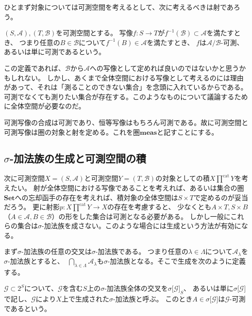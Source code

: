 \documentclass[../root.tex]{subfiles}
\begin{document}
ひとまず対象については可測空間を考えるとして、次に考えるべきは射であろう。

\begin{Def}{}{}
$ ( S, \mathscr{A} ), ( T, \mathscr{B} ) $を可測空間とする。
写像$ f\colon S\rightarrow T $が$ f^{-1}(\mathscr{B})\subset\mathscr{A} $を満たすとき、
つまり任意の$ B\in\mathscr{B} $について$ f^{-1}( B )\in\mathscr{A} $を満たすとき、
$ f $は$ \mathscr{A}/\mathscr{B} $-可測、あるいは単に可測であるという。
\end{Def}

この定義であれば、$ \mathscr{B} $から$ \mathscr{A} $への写像として定めれば良いのではないかと思うかもしれない。
しかし、あくまで全体空間における写像として考えるのには理由があって、それは「測ることのできない集合」を念頭に入れているからである。
可測でなくても測りたい集合が存在する。このようなものについて議論するために全体空間が必要なのだ。

可測写像の合成は可測であり、恒等写像はもちろん可測である。故に可測空間と可測写像は圏の対象と射を定める。これを圏$ \mathbf{meas} $と記すことにする。




\subsection{$ \sigma $-加法族の生成と可測空間の積}
次に可測空間$ X=( S, \mathscr{A} ) $と可測空間$ Y=( T, \mathscr{B} ) $の対象としての積$ X\prod^{\mathrm{cat}}Y $を考えたい。
射が全体空間における写像であることを考えれば、あるいは集合の圏$ \mathbf{Set} $への忘却函手の存在を考えれば、積対象の全体空間は$ S\times T $で定めるのが妥当だろう。
更に射影$ p\colon X\prod^{\mathrm{cat}}Y\rightarrow X $の存在を考慮すると、
少なくとも$ A\times T, S\times B $（$ A\in\mathscr{A}, B\in\mathscr{B} $）の形をした集合は可測となる必要がある。
しかし一般にこれらの集合は$ \sigma $-加法族を成さない。このような場合には生成という方法が有効になる。

まず$ \sigma $-加法族の任意の交叉は$ \sigma $-加法族である。
つまり任意の$ \lambda\in\Lambda $について$ \mathscr{A}_{\lambda} $を$ \sigma $-加法族とすると、
$ \ \bigcap_{\lambda\in\Lambda}\mathscr{A}_{\lambda} $も$ \sigma $-加法族となる。そこで生成を次のように定義する。

\begin{Def}{}{}
$ \mathscr{G}\subset 2^{S} $について、$ \mathscr{G} $を含む$ S $上の$ \sigma $-加法族全体の交叉を$ \sigma\lbrack \mathscr{G} \rbrack_{S} $、
あるいは単に$ \sigma\lbrack \mathscr{G} \rbrack $で記し、$ \mathscr{G} $により$ X $上で生成された$ \sigma $-加法族と呼ぶ。
このとき$ A\in\sigma\lbrack \mathscr{G} \rbrack $は$ \mathscr{G} $-可測であるという。
\end{Def}
\end{document}
